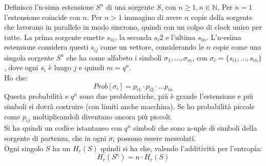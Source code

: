 \documentclass[a4paper,12pt, oneside]{book}
\begin{document}
\begin{definizione}
  Definisco l'n-sima estensione $S^n$ di una sorgente $S$, con $n\geq 1, n\in
  \mathbb{N}$, Per $n=1$ l'estensione coincide con $n$. Per $n>1$ immagino di
  avere $n$ copie della sorgente che lavorano in parallelo in modo sincrono,
  quindi con un colpo di clock unico per tutte. La prima sorgente emette
  $s_{i1}$, la seconda $s_i2$ e l'ultima $s_{in}$. L'n-esima estensione
  considera questi $s_{ij}$ come un vettore, considerando le $n$ copie come una
  singola sorgente $S^n$ che ha come alfabeto i simboli $\sigma_1,
  \ldots,\sigma_m$, con $\sigma_i=\{s_{i1},\ldots, s_{in}\}$, dove ogni $s_i$ è
  lungo $j$ e quindi $m=q^n$. \\
  Ho che:
  \[Prob[\sigma_i]=p_{i1}\cdot p_{i2}\cdot \ldots p_{in}\]
  Questa probabilità e $q^n$ sono due problematiche, più è grande l'estensione e
  più simboli si dovrà costruire (con limiti anche macchina). Se ho probabilità
  piccole come $p_{ij}$ moltiplicandoli diventano ancora più piccoli.\\
  Si ha quindi un codice istantaneo con $q^n$ simboli che sono n-uple di simboli
  della sorgente di partenza, che in ogni $\sigma_i$ possono essere
  mescolati. \\
  Ogni singolo $S$ ha un $H_r(S)$ quindi si ha che, valendo l'additività per
  l'entropia: 
  \[H_r(S^n)=n\cdot H_r(S)\]
  
\end{definizione}
\end{document}
